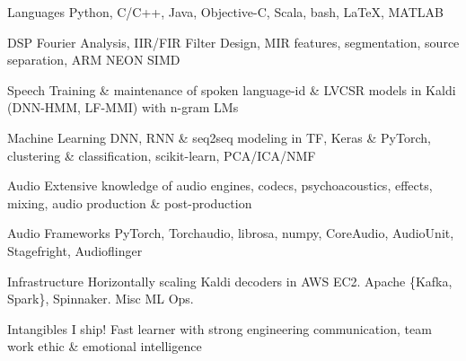 

\begin{cvskills}

  \cvskill
    {Languages} %
    {Python, C/C++, Java, Objective-C, Scala, bash, LaTeX, MATLAB}

  \cvskill
    {DSP} %
    {Fourier Analysis, IIR/FIR Filter Design, MIR features, segmentation, source separation, ARM NEON SIMD} %
    
  \cvskill
    {Speech} %
    {Training \& maintenance of spoken language-id \& LVCSR models in Kaldi (DNN-HMM, LF-MMI) with n-gram LMs} %

  \cvskill
    {Machine Learning} %
    {DNN, RNN \& seq2seq modeling in TF, Keras \& PyTorch, clustering \& classification, scikit-learn, PCA/ICA/NMF} %
       
  \cvskill
    {Audio} %
    {Extensive knowledge of audio engines, codecs, psychoacoustics, effects, mixing, audio production \& post-production } %

  \cvskill
    {Audio Frameworks} %
    {PyTorch, Torchaudio, librosa, numpy, CoreAudio, AudioUnit, Stagefright, Audioflinger} %

  \cvskill
    {Infrastructure} %
    {Horizontally scaling Kaldi decoders in AWS EC2. Apache \{Kafka, Spark\}, Spinnaker. Misc ML Ops.} %

  \cvskill
    {Intangibles} %
    {I ship! Fast learner with strong engineering communication, team work ethic \& emotional intelligence} %



\end{cvskills}

